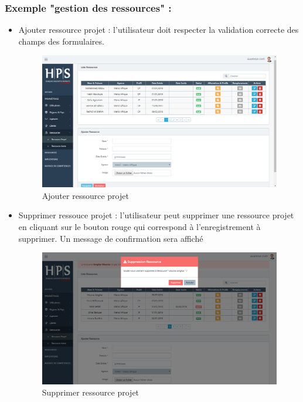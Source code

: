\begin{itemize}[label=\textbullet]
\subsubsection*{Exemple "gestion des ressources" : }
\begin{itemize}
			\item Ajouter ressource projet :  l'utilisateur doit respecter la validation correcte des champs des formulaires.  \newpage
			\begin{figure}[h!]  
			\centering
			\includegraphics[width=1\textwidth]{chapitre5/Figures/addressource.png}
			\caption{Ajouter ressource projet}
			\end{figure}
			\item Supprimer ressouce projet : l'utilisateur peut supprimer une ressource projet en cliquant sur le bouton rouge qui correspond à l'enregistrement à supprimer. Un message de confirmation sera affiché
			\begin{figure}[h!]  
			\centering
			\includegraphics[width=1\textwidth]{chapitre5/Figures/supressource.png}
			\caption{Supprimer ressource projet}
			\end{figure}

\end{itemize}
\end{itemize}

